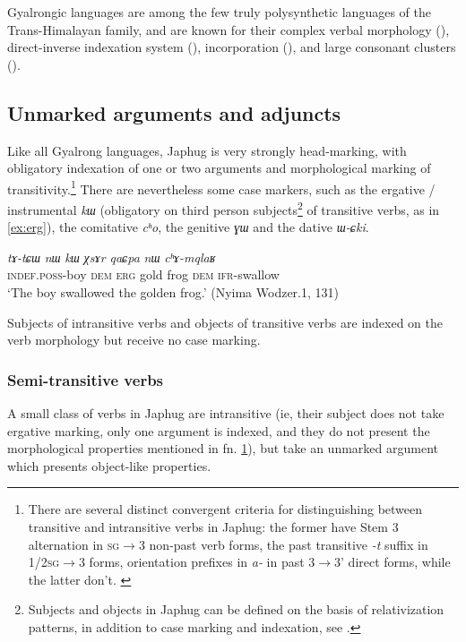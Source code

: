\documentclass[oneside,a4paper,11pt]{article}
\newcommand{\ipa}[1]{\textit{\phon#1}}
\begin{document}
Gyalrongic languages are among the few truly polysynthetic languages of the Trans-Himalayan family, and are known for their complex verbal morphology (\citealt{jackson00sidaba, jacques13harmonization, lai13affixale, delancey15complexity}), direct-inverse indexation system (\citealt{delancey81direction, jackson02rentongdengdi, jacques10inverse, gongxun14agreement, lai15person}), incorporation (\citealt{jacques12incorp, lai15person}), and large consonant clusters (\citealt{jackson07shangzhai, japhug14ideophones}).
 
 \subsection{Unmarked arguments and adjuncts} \label{sec:adjuncts}
Like all Gyalrong languages, Japhug is very strongly head-marking, with obligatory indexation of one or two arguments and morphological marking of transitivity.\footnote{There are several distinct convergent criteria for distinguishing between transitive and intransitive verbs in Japhug: the former have Stem 3 alternation in \textsc{sg}$\rightarrow$3 non-past verb forms, the past transitive \ipa{-t} suffix in \textsc{1/2sg}$\rightarrow$3 forms, orientation prefixes in \ipa{a-} in past 3$\rightarrow$3' direct forms, while the latter don't. \label{ft:transitivity}  } 
There are nevertheless some case markers, such as the ergative / instrumental \ipa{kɯ} (obligatory on third person subjects\footnote{Subjects and objects in Japhug can be defined on the basis of relativization patterns, in addition to case marking and indexation, see \citet{jacques16relatives}. } of transitive verbs, as in \ref{ex:erg}), the comitative \ipa{cʰo}, the genitive \ipa{ɣɯ} and the dative \ipa{ɯ-ɕki}.  

\begin{exe}
\ex \label{ex:erg}
\gll \ipa{tɤ-tɕɯ}  	\ipa{nɯ}  	\ipa{kɯ}  	\ipa{χsɤr}  	\ipa{qaɕpa}  	\ipa{nɯ}  	\ipa{cʰɤ-mqlaʁ}   \\
\textsc{indef.poss}-boy \textsc{dem} \textsc{erg} gold frog \textsc{dem} \textsc{ifr}-swallow \\
\glt `The boy swallowed the golden frog.' (Nyima Wodzer.1, 131)
\end{exe}

Subjects of intransitive verbs and objects of transitive verbs are indexed on the verb morphology but receive no case marking. 
 
\subsubsection{Semi-transitive verbs} \label{sec:semi}
A small class of verbs in Japhug are intransitive (ie, their subject does not take ergative marking, only one argument is indexed, and they do not present the morphological properties mentioned in fn. \ref{ft:transitivity}), but take an unmarked argument which presents object-like properties.
\end{document}
